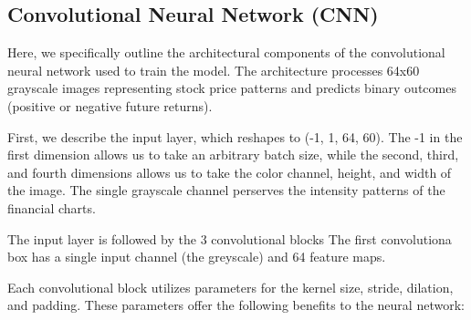 \documentclass[12pt]{article}
\begin{document}
\subsection*{Convolutional Neural Network (CNN)}

Here, we specifically outline the architectural components of the convolutional neural network used to train the model. The architecture processes 64x60 grayscale images representing stock price patterns and predicts binary outcomes (positive or negative future returns).

First, we describe the input layer, which reshapes to (-1, 1, 64, 60). The -1 in the first dimension allows us to take an arbitrary batch size, while the second, third, and fourth dimensions allows us to take the color channel, height, and width of the image. The single grayscale channel perserves the intensity patterns of the financial charts. 

The input layer is followed by the 3 convolutional blocks The first convolutiona box has a single input channel (the greyscale) and 64 feature maps.

Each convolutional block utilizes parameters for the kernel size, stride, dilation, and padding. These parameters offer the following benefits to the neural network:
\end{document}
